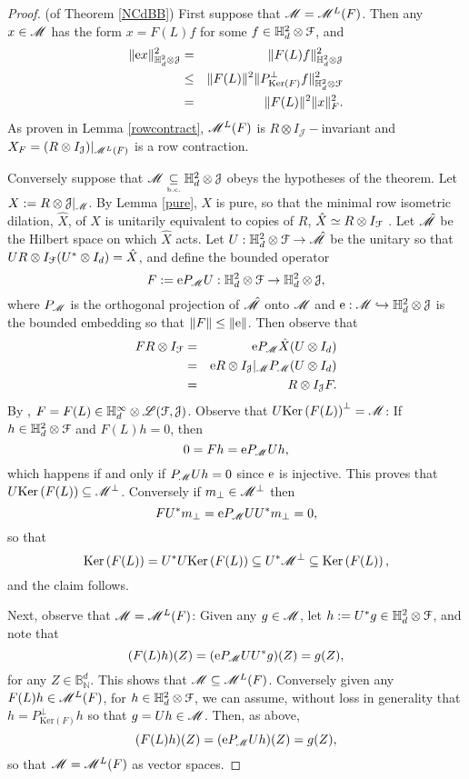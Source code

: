 \documentclass[11pt]{article}
\newcommand{\ba}{\begin{eqnarray}}
\newcommand{\ea}{\end{eqnarray}}
\newcommand{\nn}{\nonumber}
\newcommand{\mr}{\ensuremath{\mathrm}}
\newcommand{\scr}{\ensuremath{\mathscr}}
\newcommand{\mc}{\ensuremath{\mathcal}}
\def\N{\mathbb{N}}
\def\B{\mathbb{B}}
\def\bH{\mathbb{H}}
\def\bc{\underset{\mbox{\tiny \mbox{\tiny b.c.}}}{\subseteq}}
\newcommand{\J}{\ensuremath{\mathcal{J} }}
\renewcommand{\L}{\ensuremath{\mathscr{L} }}
\renewcommand{\ker}[1]{\ensuremath{\mathrm{Ker} \left( {#1} \right) }}
\numberwithin{equation}{section}
\numberwithin{subsection}{section}
\theoremstyle{definition}
\begin{document}
\begin{proof}{ (of Theorem \ref{NCdBB}) }
First suppose that $\scr{M} = \scr{M} ^L (F)$. Then any $x \in \scr{M}$ has the form $x= F(L) f$ for some $f \in \bH ^2 _d \otimes \mc{F}$, and 
\ba \| \mr{e} x \| ^2 _{\bH ^2 _d \otimes \J} & = & \| F(L) f \| ^2 _{\bH ^2 _d \otimes \J } \nn \\
& \leq & \| F(L) \| ^2 \| P _{\ker{F}} ^\perp f \| ^2 _{\bH ^2 _d \otimes \mc{F}} \nn \\
& = & \| F(L) \| ^2 \| x \| ^2 _{F}. \nn \ea As proven in Lemma \ref{rowcontract}, $\scr{M} ^L (F)$ is $R\otimes I_\J -$invariant and $X_F = (R \otimes I_\J ) | _{\scr{M} ^L (F)}$ is a row contraction.

Conversely suppose that $\scr{M} \bc \bH ^2 _d \otimes \J$ obeys the hypotheses of the theorem. 
Let $X := R \otimes \J | _{\scr{M}} $. By Lemma \ref{pure}, $X$ is pure, so that the minimal row isometric dilation, $\hat{X}$, of $X$ is unitarily equivalent to copies of $R$, $\hat{X} \simeq R \otimes I _\mc{F}$ \cite[Proposition 2.3]{Pop-dil}. Let $\hat{\scr{M}}$ be the Hilbert space on which $\hat{X}$ acts. Let $U : \bH ^2 _d \otimes \mc{F} \rightarrow \hat{\scr{M}}$ be the unitary so that $U R \otimes I_{\mc{F}} (U^* \otimes I_d ) = \hat{X}$, and define the bounded operator 
$$ F:=   \mr{e} P _\scr{M} U : \bH ^2 _d \otimes \mc{F} \rightarrow \bH ^2 _d \otimes \J, $$ where $P_\scr{M}$ is the orthogonal projection of $\hat{\scr{M}}$ onto $\scr{M}$ and $\mr{e} : \scr{M}  \hookrightarrow \bH ^2 _d \otimes \J$ is the bounded embedding so that $\| F \| \leq \| \mr{e} \|$. Then observe that 
\ba F R \otimes I _{\mc{F}} & = & \mr{e} P _\scr{M} \hat{X}  (U \otimes I_d )  \nn \\
& = & \mr{e} R \otimes I_{\mc{J}} | _{\scr{M}} P_{\scr{M}} (U \otimes I_d ) \nn \\
& = & R \otimes I_\J F. \nn \ea By \cite[Theorem 1.2]{DP-inv}, $F = F(L) \in  \bH ^\infty _d \otimes \L (\mc{F} , \J )$. Observe that $U \ker{F (L)} ^\perp = \scr{M}$: If $h \in \bH ^2 _d \otimes \mc{F}$ and $F(L) h = 0$, then  
$$ 0  =  Fh  = \mr{e} P_\scr{M} U h, $$ which happens if and only if $P_\scr{M} U h = 0 $ since $\mr{e}$ is injective.
This proves that $U \ker{F(L)} \subseteq \scr{M} ^\perp$. Conversely if $m_\perp \in \scr{M} ^\perp$ then
$$ F U^* m_\perp = \mr{e} P_\scr{M} U U^* m_\perp =0, $$ so that 
$$ \ker{F(L)} = U^* U \ker{F(L)} \subseteq U^* \scr{M} ^\perp \subseteq \ker{F(L)}, $$ and the claim follows. 

Next, observe that $\scr{M} = \scr{M} ^L (F)$: Given any $g \in \scr{M}$, let $h := U^* g  \in \bH ^2 _d \otimes \mc{F}$, and note that 
$$ (F (L) h ) (Z) = (\mr{e} P_\scr{M} U U^* g) (Z) = g(Z), $$ for any $Z \in \B ^d _\N$. This shows that $\scr{M} \subseteq \scr{M} ^L (F)$. Conversely given any $F(L) h \in \scr{M} ^L (F)$, for $h \in \bH ^2 _d \otimes \mc{F}$, we can assume, without loss in generality that $h = P _{\ker{F} } ^\perp h$ so that $g= Uh \in \scr{M}$. Then, as above, 
$$ (F(L) h) (Z) = (\mr{e} P_\scr{M} U h ) (Z) = g(Z), $$ so that $\scr{M} = \scr{M} ^L (F)$ as vector spaces.


\end{proof}
\end{document}
